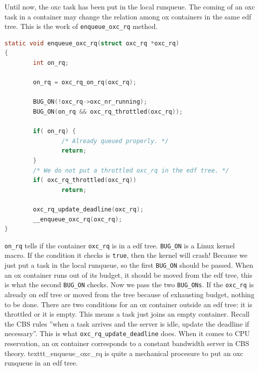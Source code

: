 Until now, the oxc task has been put in the local runqueue. The coming of an
oxc task in a container may change the relation among ox containers in the
same edf tree. This is the work of \texttt{enqueue\_oxc\_rq} method. 
\begin{lstlisting}[language=C]
static void enqueue_oxc_rq(struct oxc_rq *oxc_rq)
{
        int on_rq;

        on_rq = oxc_rq_on_rq(oxc_rq);

        BUG_ON(!oxc_rq->oxc_nr_running);
        BUG_ON(on_rq && oxc_rq_throttled(oxc_rq));

        if( on_rq) {
                /* Already queued properly. */
                return;
        }
        /* We do not put a throttled oxc_rq in the edf tree. */
        if( oxc_rq_throttled(oxc_rq))
                return;

        oxc_rq_update_deadline(oxc_rq);
        __enqueue_oxc_rq(oxc_rq);
}
\end{lstlisting}
\texttt{on\_rq} tells if the container \texttt{oxc\_rq} is in a edf tree.
\texttt{BUG\_ON} is a Linux kernel macro. If the condition it checks is 
\texttt{true}, then the kernel will crash! Because we just put a task
in the local runqueue, so the first \texttt{BUG\_ON} should be passed.
When an ox container runs out of its budget, it should be moved from the
edf tree, this is what the second \texttt{BUG\_ON} checks. Now we pass
the two \texttt{BUG\_ONs}. If the \texttt{oxc\_rq} is already on edf 
tree or moved from the tree because of exhausting budget, nothing to
be done. There are two conditions for an ox container outside an edf
tree: it is throttled or it is empty. This means a task just joins
an empty container. Recall the CBS rules ''when a task arrives and 
the server is idle, update the deadline if necessary''. This is what
\texttt{oxc\_rq\_update\_deadline} does. When it comes to CPU reservation,
an ox container corresponds to a constant bandwidth server in CBS theory.
texttt{\_enqueue\_oxc\_rq} is quite a mechanical procesure to put an
oxc runqueue in an edf tree.

